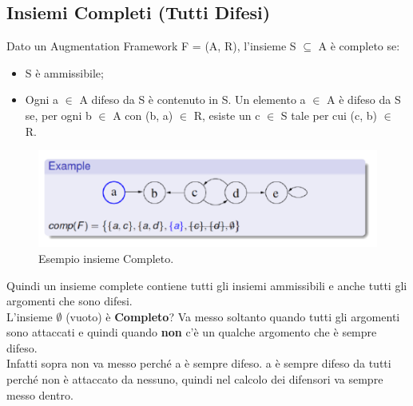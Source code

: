 \subsection{Insiemi Completi (Tutti Difesi)}
Dato un Augmentation Framework F = (A, R), l'insieme S $\subseteq$ A è completo
se:
\begin{itemize}
    \item S è ammissibile;
    \item Ogni a $\in$ A difeso da S è contenuto in S. Un elemento a $\in$ A è
          difeso da S se, per ogni b $\in$ A con (b, a) $\in$ R, esiste un c $\in$ S
          tale per cui (c, b) $\in$ R.
\end{itemize}
\begin{figure}[htp]
    \centering
    \includegraphics[width=12cm, keepaspectratio]{img/Cap6/completo.png}
    \caption{Esempio insieme Completo.}
\end{figure}
Quindi un insieme complete contiene tutti gli insiemi ammissibili e anche tutti
gli argomenti che sono difesi. \\L'insieme $\emptyset$ (vuoto) è \textbf{Completo}? Va messo
soltanto quando tutti gli argomenti sono attaccati e quindi quando \textbf{non}
c'è un qualche argomento che è sempre difeso. \\Infatti sopra non va messo
perché a è sempre difeso. a è sempre difeso da tutti perché non è attaccato da
nessuno, quindi nel calcolo dei difensori va sempre messo dentro.

